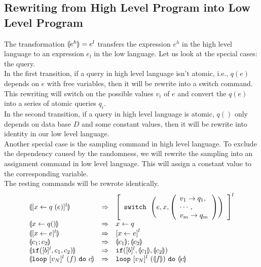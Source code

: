 \documentclass[a4paper,11pt]{article}
\begin{document}
\subsection{Rewriting from High Level Program into Low Level Program}
%
The transformation $\llparenthesis {e^h} \rrparenthesis = e^l$ transfers the expression $e^h$ in the high level language to an expression $e_l$ in the low language. 
Let us look at the special cases: the query.
\\
In the first transition, if a query in high level language isn't atomic, i.e., 
$q(e)$ depends on $e$ with free variables, then it will be rewrite into a switch command. 
This rewriting will switch on the possible values $v_i$ of $e$ and convert the $q(e)$ into a series of atomic queries $q_i$.
\\
In the second transition, if a query in high level language is atomic, $q()$ only depends on data base $D$ and some constant values,
then it will be rewrite into identity in our low level language.
\\
Another special case is the sampling command in high level language. To exclude the dependency caused by the randomness, we will rewrite the sampling into an assignment command in low level language. This will assign a constant value to the corresponding variable.
\\
The resting commands will be rewrote identically.
%
%
\[
\begin{array}{lll}
\ts{ [\assign x q(e)]^{l}}
        & \Rightarrow &
        \left[
        \begin{array}{l}
             \eswitch ~ \Bigg(\expr, x, 
            \left(\begin{array}{l}
           v_1 \to q_1, \\
            \cdots, \\
            v_m \to q_m
            \end{array}\right) 
            \Bigg) \\
        \end{array}
        \right]^{l}\\
    \ts{\assign{x}{q()}} & \Rightarrow & \assign{x}{q}\\
 \ts{[\assign{x}{\expr} ]^{l}}   &   \Rightarrow & \left[ \assign x \expr \right]^{l} \\
 \ts{ c_1 ; c_2 }     & \Rightarrow  & \ts{c_1} ; \ts{c_2} \\
  \ts{\eif([\bexpr]^{l}, c_1, c_2)}  &  \Rightarrow & \eif([\bexpr]^{l}, \ts{c_1}, \ts{c_2}) \\
 \ts{  \eloop ~ [\valr_N]^{l} ~ (f) ~ \edo ~ c  } & \Rightarrow & \eloop ~ [\valr_N]^{l} ~ (\ts{f}) ~ \edo ~ \ts{c}  \\
\end{array}
\]
\end{document}
